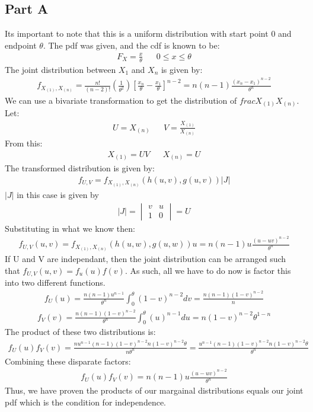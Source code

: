 \documentclass{article}
\begin{document}
\subsection*{Part A}
Its important to note that this is a uniform distribution with start point $0$ and endpoint $\theta$.
The pdf was given, and the cdf is known to be:
\begin{align*}
F_X = \frac{x}{\theta} && 0 \leq x \leq \theta
\end{align*}
The joint distribution between $X_1$ and $X_n$ is given by:
\begin{align*}
f_{X_{(1)},X_{(n)}} = \frac{n!}{(n-2)!} (\frac{1}{\theta^2}) [\frac{x_n}{\theta}-\frac{x_1}{\theta}]^{n-2} = n(n-1) \frac{(x_n-x_1)^{n-2}}{\theta^n}
\end{align*}
We can use a bivariate transformation to get the distribution of $frac{X_{(1)}}{X_{(n)}}$. Let:
\begin{align*}
U = X_{(n)} && V = \frac{X_{(1)}}{X_{(n)}} 
\end{align*}
From this:
\begin{align*}
X_{(1)} = UV && X_{(n)} = U 
\end{align*}
The transformed distribution is given by:
\begin{align*}
f_{U,V} = f_{X_{(1)},X_{(n)}}(h(u,v),g(u,v)) |J|
\end{align*}
$|J|$ in this case is given by
\begin{align*}
|J| = \begin{vmatrix}
v & u \\
1 & 0
\end{vmatrix} = U
\end{align*}
Substituting in what we know then:
\begin{align*}
f_{U,V}(u,v) = f_{X_{(1)},X_{(n)}}(h(u,w),g(u,w)) u = n(n-1)u \frac{(u-uv)^{n-2}}{\theta^n}
\end{align*}
If U and V are independant, then the joint distribution can be arranged such that $f_{U,V}(u,v)=f_u(u)f(v)$. As such, all we have to do now is factor this into two different functions.
\begin{align*}
f_{U}(u) = \frac{n(n-1)u^{n-1}}{\theta^n} \int_0^\theta (1-v)^{n-2} dv = \frac{n (n-1) (1-v)^{n-2}}{n}
\end{align*}
\begin{align*}
f_{V}(v) = \frac{n(n-1)(1-v)^{n-2}}{\theta^n} \int_0^\theta (u)^{n-1} du = n(1-v)^{n-2} \theta^{1-n}
\end{align*}
The product of these two distributions is:
\begin{align*}
f_{U}(u)f_{V}(v) = \frac{n u^{n-1}(n-1) (1-v)^{n-2} n(1-v)^{n-2} \theta}{n \theta^n} = \frac{u^{n-1}(n-1) (1-v)^{n-2} n(1-v)^{n-2}\theta}{\theta^n}
\end{align*}
Combining these disparate factors:
\begin{align*}
\boxed{ f_{U}(u)f_{V}(v) = n(n-1)u \frac{(u-uv)^{n-2}}{\theta^n} }
\end{align*}
Thus, we have proven the products of our margainal distributions equals our joint pdf which is the condition for independence.
\end{document}
